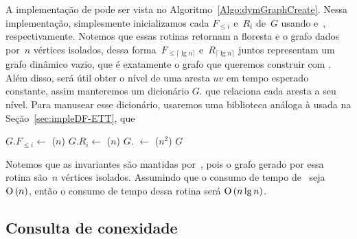 A implementação de \dymGraphCreate{} pode ser vista no Algoritmo~\ref{Algo:dymGraphCreate}. Nessa implementação, simplesmente inicializamos cada $F_{\leqslant i}$ e~$R_i$ de~$G$ usando \dymForestCreate{} e~\graphCreate{}, respectivamente. Notemos que essas rotinas retornam a floresta e o grafo dados por~$n$ vértices isolados, dessa forma~$F_{\leqslant \lceil \lg n \rceil}$ e~$R_{\lceil \lg n \rceil}$ juntos representam um grafo dinâmico vazio, que é exatamente o grafo que queremos construir com \dymGraphCreate{}. Além disso, será útil obter o nível de uma aresta $uv$ em tempo esperado constante, assim manteremos um dicionário $G$.\nivel{} que relaciona cada aresta a seu nível. Para manusear esse dicionário, usaremos uma biblioteca análoga à usada na Seção~\ref{sec:impleDF-ETT}, que 

\begin{algorithm}
\caption{\dymGraphCreate($n$)}
\label{Algo:dymGraphCreate}
\begin{algorithmic}[1]
\State $G.F_{\leqslant i} \gets$ \dymForestCreate($n$)
\State $G.R_i \gets$ \graphCreate($n$)
\EndFor
\State $G$.\nivel{} $\gets$ \hashCreate($n^2$)
\State \Return $G$ 
\end{algorithmic}
\end{algorithm}


Notemos que as invariantes são mantidas por~\dymGraphCreate{}, pois o grafo gerado por essa rotina são~$n$ vértices isolados. Assumindo que o consumo de tempo de~\graphCreate{} seja~$\text{O}\left(n\right)$, então o consumo de tempo dessa rotina será $\text{O}\left(n\lg n\right)$.

\subsection{Consulta de conexidade}

